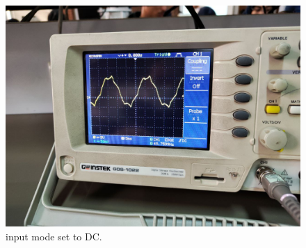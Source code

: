 \documentclass[11pt]{article}
\newcommand{\PicScale}{0.2}
\begin{document}
\begin{question}
{        \begin{figure}[H]
            \begin{center}
                \includegraphics[scale=\PicScale]{Fig/9.jpeg}
                \caption{input mode set to DC.}
            \end{center}
        \end{figure}

    }

\end{question}

\end{document}
